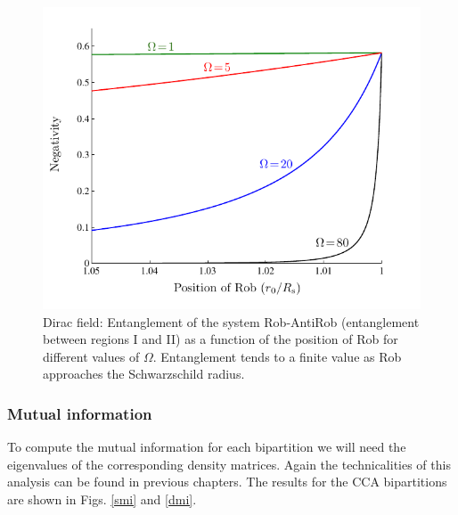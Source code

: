 \begin{figure}[h]
\begin{center}
\includegraphics[width=.85\textwidth]{negaaarf}
\caption{Dirac field: Entanglement of the system Rob-AntiRob
(entanglement between regions I and II) as a function of the position of Rob for
different values of $\Omega$. Entanglement tends to a finite value as Rob
approaches   the Schwarzschild radius.}
\label{dnrar}
\end{center}
\end{figure}







\subsubsection{Mutual information}

To compute the
mutual information  for each bipartition we will need the eigenvalues of
the corresponding density matrices. Again the technicalities of this
analysis can be found in previous chapters. The results for the
CCA bipartitions are shown in Figs. \ref{smi} and \ref{dmi}.

